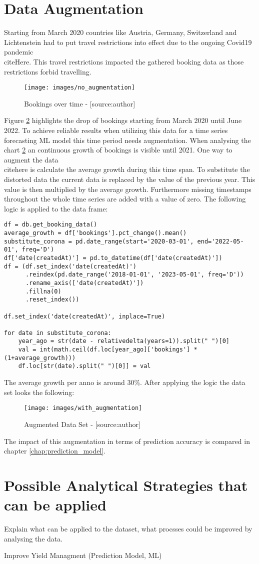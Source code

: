 \section{Data Augmentation}
\label{sec:data_aug}
Starting from March 2020 countries like Austria, Germany, Switzerland and Lichtenstein had to put travel restrictions into effect due to the ongoing Covid19 pandemic \\citeHere. This travel restrictions impacted the gathered booking data as those restrictions forbid travelling.
\begin{figure}[H]
	\centering
		\texttt{[image: images/no\_augmentation]}
	\caption{Bookings over time - [source:author]}
	\label{fig:noAug}
\end{figure}
Figure \ref{fig:noAug} highlights the drop of bookings starting from March 2020 until June 2022. To achieve reliable results when utilizing this data for a time series forecasting ML model this time period needs augmentation. When analysing the chart \ref{fig:noAug} an continuous growth of bookings is visible until 2021. One way to augment the data \\citehere is calculate the average growth during this time span. To substitute the distorted data the current data is replaced by the value of the previous year. This value is then multiplied by the average growth. Furthermore missing timestamps throughout the whole time series are added with a value of zero. The following logic is applied to the data frame: 

\begin{lstlisting}
df = db.get_booking_data()
average_growth = df['bookings'].pct_change().mean()
substitute_corona = pd.date_range(start='2020-03-01', end='2022-05-01', freq='D')
df['date(createdAt)'] = pd.to_datetime(df['date(createdAt)'])
df = (df.set_index('date(createdAt)')
      .reindex(pd.date_range('2018-01-01', '2023-05-01', freq='D'))
      .rename_axis(['date(createdAt)'])
      .fillna(0)
      .reset_index())

df.set_index('date(createdAt)', inplace=True)

for date in substitute_corona:
    year_ago = str(date - relativedelta(years=1)).split(" ")[0]
    val = int(math.ceil(df.loc[year_ago]['bookings'] * (1+average_growth)))
    df.loc[str(date).split(" ")[0]] = val
\end{lstlisting}

The average growth per anno is around 30\%. After applying the logic the data set looks the following:  
\begin{figure}[H]
	\centering
		\texttt{[image: images/with\_augmentation]}
	\caption{Augmented Data Set - [source:author]}
	\label{fig:noAug}
\end{figure}
The impact of this augmentation in terms of prediction accuracy is compared in chapter \ref{chap:prediction_model}.

\section{Possible Analytical Strategies that can be applied }

Explain what can be applied to the dataset, what procsses could be improved by analysing the data. 

Improve Yield Managment  (Prediction Model, ML) 

